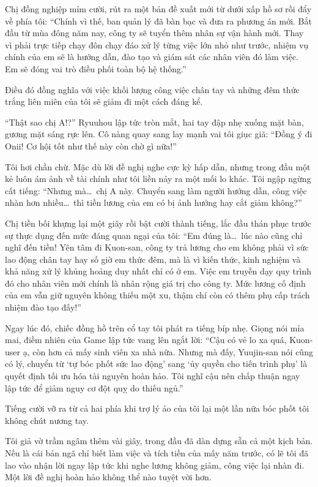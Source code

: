 \documentclass[../main.tex]{subfiles}
\begin{document}
Chị đồng nghiệp mỉm cười, rút ra một bản đề xuất mới từ dưới xấp hồ sơ rồi đẩy về phía tôi: ``Chính vì thế, ban quản lý đã bàn bạc và đưa ra phương án mới. Bắt đầu từ mùa đông năm nay, công ty sẽ tuyển thêm nhân sự vận hành mới. Thay vì phải trực tiếp chạy đôn chạy đáo xử lý từng việc lớn nhỏ như trước, nhiệm vụ chính của em sẽ là hướng dẫn, đào tạo và giám sát các nhân viên đó làm việc. Em sẽ đóng vai trò điều phối toàn bộ hệ thống.''

Điều đó đồng nghĩa với việc khối lượng công việc chân tay và những đêm thức trắng liên miên của tôi sẽ giảm đi một cách đáng kể.

``Thật sao chị A!?'' Ryuuhou lập tức tròn mắt, hai tay đập nhẹ xuống mặt bàn, gương mặt sáng rực lên. Cô nàng quay sang lay mạnh vai tôi giục giã: ``Đồng ý đi Onii! Cơ hội tốt như thế này còn chờ gì nữa!''

Tôi hơi chần chừ. Mặc dù lời đề nghị nghe cực kỳ hấp dẫn, nhưng trong đầu một kẻ luôn ám ảnh về tài chính như tôi liền nảy ra một mối lo khác. Tôi ngập ngừng cất tiếng: ``Nhưng mà\dots\ chị A này. Chuyển sang làm người hướng dẫn, công việc nhàn hơn nhiều\dots\ thì tiền lương của em có bị ảnh hưởng hay cắt giảm không?''

Chị tiền bối khựng lại một giây rồi bật cười thành tiếng, lắc đầu thán phục trước sự thực dụng đến mức đáng quan ngại của tôi: ``Em đúng là\dots\ lúc nào cũng chỉ nghĩ đến tiền! Yên tâm đi Kuon-san, công ty trả lương cho em không phải vì sức lao động chân tay hay số giờ em thức đêm, mà là vì kiến thức, kinh nghiệm và khả năng xử lý khủng hoảng duy nhất chỉ có ở em. Việc em truyền dạy quy trình đó cho nhân viên mới chính là nhân rộng giá trị cho công ty. Mức lương cố định của em vẫn giữ nguyên không thiếu một xu, thậm chí còn có thêm phụ cấp trách nhiệm đào tạo đấy!''

Ngay lúc đó, chiếc đồng hồ trên cổ tay tôi phát ra tiếng bíp nhẹ. Giọng nói mỉa mai, điềm nhiên của Game lập tức vang lên ngắt lời: ``Cậu có vẻ lo xa quá, Kuon-user ạ, còn hơn cả mấy sinh viên xa nhà nữa. Nhưng mà đấy, Yuujin-san nói cũng có lý, chuyển từ `tự bóc phốt sức lao động' sang `ủy quyền cho tiến trình phụ' là quyết định tối ưu hóa tài nguyên hoàn hảo. Tôi nghĩ cậu nên chấp thuận ngay lập tức để giảm nguy cơ đột quỵ do thiếu ngủ.''

Tiếng cười vỡ ra từ cả hai phía khi trợ lý ảo của tôi lại một lần nữa bóc phốt tôi không chút nương tay.

Tôi giả vờ trầm ngâm thêm vài giây, trong đầu đã dàn dựng sẵn cả một kịch bản. Nếu là cái bản ngã chỉ biết làm việc và tích tiền của mấy năm trước, có lẽ tôi đã lao vào nhận lời ngay lập tức khi nghe lương không giảm, công việc lại nhàn đi. Một lời đề nghị hoàn hảo không thể nào tuyệt vời hơn.
\end{document}
